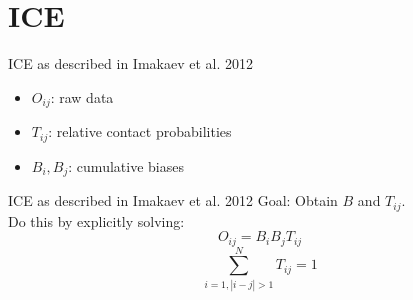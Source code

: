 \section{ICE}



\begin{frame}[c]{ICE as described in Imakaev et al. 2012 \cite{imakaev2012iterative}}
    \Large
    \begin{itemize}[<+(1)->]
        \item $O_{ij}$: raw data
        \item $T_{ij}$: relative contact probabilities
        \item $B_i, B_j$: cumulative biases
    \end{itemize}
\end{frame}

\begin{frame}[c]{ICE as described in Imakaev et al. 2012 \cite{imakaev2012iterative}}
    \Large
    Goal: Obtain $B$ and $T_{ij}$. \\ \pause Do this by explicitly solving:
    \begin{equation} \label{eq:1}
    O_{ij} = B_i B_j T_{ij}
    \end{equation}
    \begin{equation} \label{eq:2}
    \sum^N_{i=1, |i-j|>1} T_{ij} = 1
    \end{equation}
\end{frame}

